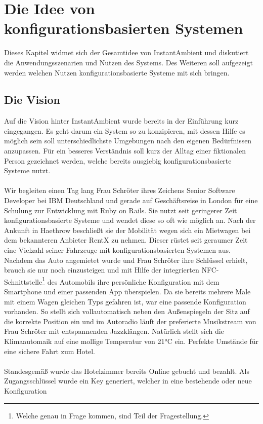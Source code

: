 \chapter{Die Idee von konfigurationsbasierten Systemen}

Dieses Kapitel widmet sich der Gesamtidee von InstantAmbient und diskutiert die Anwendungsszenarien und Nutzen des Systems. Des Weiteren soll aufgezeigt werden welchen 
Nutzen konfigurationsbasierte Systeme mit sich bringen. 

\section{Die Vision}
Auf die Vision hinter InstantAmbient wurde bereits in der Einführung kurz eingegangen. Es geht darum ein System so zu konzipieren, mit dessen Hilfe es möglich sein soll 
unterschiedlichste Umgebungen nach den eigenen Bedürfnissen anzupassen. Für ein besseres Verständnis soll kurz der Alltag einer fiktionalen Person gezeichnet werden, welche
bereits ausgiebig konfigurationsbasierte Systeme nutzt. 
\\\\
Wir begleiten einen Tag lang Frau Schröter ihres Zeichens Senior Software Developer bei IBM Deutschland und gerade auf Geschäftsreise in London für eine Schulung zur 
Entwicklung mit Ruby on Rails. Sie nutzt seit geringerer Zeit konfigurationsbasierte Systeme und wendet diese so oft wie möglich an. Nach der Ankunft in Haethrow beschließt 
sie der Mobilität wegen sich ein Mietwagen bei dem bekannteren Anbieter RentX zu nehmen. Dieser rüstet seit geraumer Zeit eine Vielzahl seiner Fahrzeuge mit 
konfigurationsbasierten Systemen aus. Nachdem das Auto angemietet wurde und Frau Schröter ihre Schlüssel erhielt, brauch sie nur noch einzusteigen und mit Hilfe der 
integrierten NFC-Schnittstelle\footnote{Welche genau in Frage kommen, sind Teil der Fragestellung.} des Automobils ihre persönliche Konfiguration mit dem Smartphone und einer 
passenden App überspielen. Da sie bereits mehrere Male mit einem Wagen gleichen Typs gefahren ist, war eine passende Konfiguration vorhanden. So stellt sich vollautomatisch
neben den Außenspiegeln der Sitz auf die korrekte Position ein und im Autoradio läuft der preferierte Musikstream von Frau Schröter mit entspannenden Jazzklängen. Natürlich
stellt sich die Klimaautomaik auf eine mollige Temperatur von 21°C ein. Perfekte Umstände für eine sichere Fahrt zum Hotel.
\\\\
Standesgemäß wurde das Hotelzimmer bereits Online gebucht und bezahlt. Als Zugangsschlüssel wurde ein Key generiert, welcher in eine bestehende oder neue Konfiguration 
